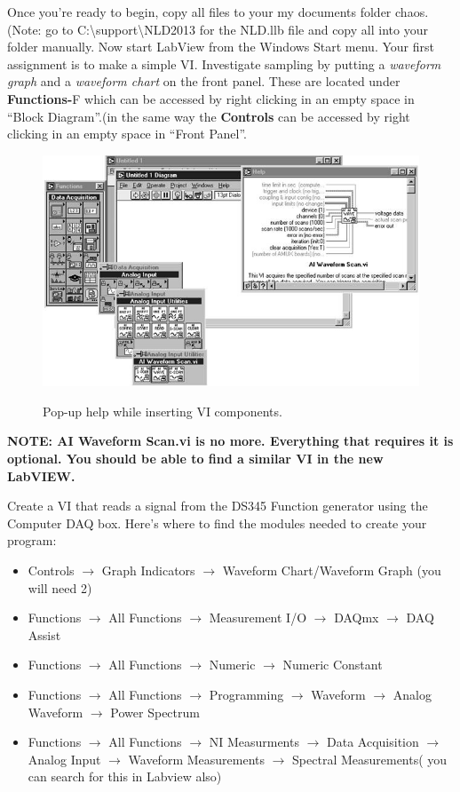 \documentclass{../lab}
\begin{document}
Once you're ready to begin, copy all files to your my documents folder chaos. (Note: go to C:\textbackslash support\textbackslash NLD2013 for the NLD.llb file and copy all into your folder manually. Now start LabView from the Windows Start menu. Your first assignment is to make a simple VI. Investigate sampling by putting a \emph{waveform graph} and a \emph{waveform chart} on the front panel. These are located under \textbf{Functions-}F which can be accessed by right clicking in an empty space in ``Block Diagram''.(in the same way the \textbf{Controls} can be accessed by right clicking in an empty space in ``Front Panel''.

\begin{figure}[h]
    \centering
    \href{http://experimentationlab.berkeley.edu/sites/default/files/images/Nldimage067.jpg}{\includegraphics[width=0.5\linewidth]{images/Nldimage067.jpg}}
    \caption{Pop-up help while inserting VI components.}
    \label{fig:Nldimage067}
\end{figure}

\textbf{NOTE: AI Waveform Scan.vi is no more. Everything that requires it is optional. You should be able to find a similar VI in the new LabVIEW.}

Create a VI that reads a signal from the DS345 Function generator using the Computer DAQ box. Here's where to find the modules needed to create your program:

\begin{itemize}
    \item Controls $\rightarrow$ Graph Indicators $\rightarrow$ Waveform Chart/Waveform Graph (you will need 2)

    \item Functions $\rightarrow$ All Functions  $\rightarrow$  Measurement I/O  $\rightarrow$  DAQmx $\rightarrow$  DAQ Assist

    \item Functions $\rightarrow$ All Functions $\rightarrow$ Numeric $\rightarrow$ Numeric Constant

    \item Functions $\rightarrow$ All Functions $\rightarrow$ Programming $\rightarrow$ Waveform $\rightarrow$ Analog Waveform $\rightarrow$ Power Spectrum

    \item Functions $\rightarrow$ All Functions $\rightarrow$ NI Measurments $\rightarrow$ Data Acquisition $\rightarrow$ Analog Input $\rightarrow$ Waveform Measurements $\rightarrow$ Spectral Measurements( you can search for this in Labview also)
\end{itemize}
\end{document}
